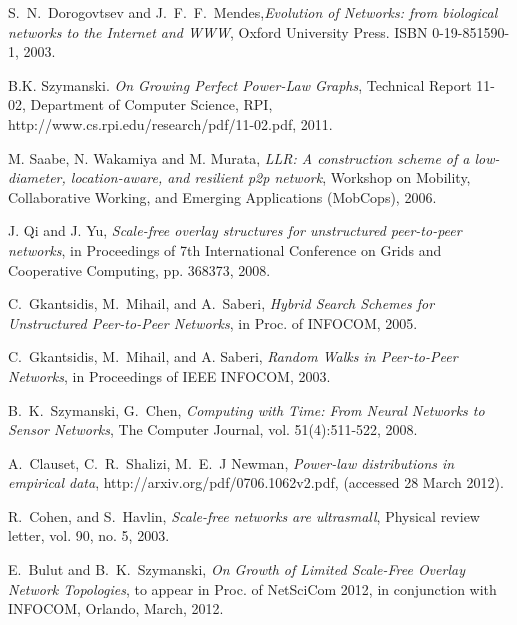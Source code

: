 \documentclass[10pt,journal,cspaper,compsoc]{IEEEtran}
\begin{document}
\begin{thebibliography}{1}
 S.~N.~Dorogovtsev and J.~F.~F.~Mendes,\emph{Evolution of Networks: from biological networks to the Internet and WWW}, Oxford University Press. ISBN 0-19-851590-1, 2003.





 B.K. Szymanski. \emph{On Growing Perfect Power-Law Graphs}, Technical Report 11-02, Department of Computer Science, RPI, http://www.cs.rpi.edu/research/pdf/11-02.pdf, 2011.




M. Saabe, N. Wakamiya and M. Murata, \emph{LLR: A construction scheme of a low-diameter, location-aware, and resilient p2p network}, Workshop on Mobility, Collaborative Working, and Emerging Applications (MobCops), 2006.



 J. Qi and J. Yu, \emph{Scale-free overlay structures for unstructured peer-to-peer networks}, in Proceedings of 7th International Conference on Grids and Cooperative Computing, pp. 368373, 2008.


 C.~Gkantsidis, M.~Mihail, and A.~Saberi, \emph{Hybrid Search Schemes for Unstructured Peer-to-Peer Networks}, in Proc. of INFOCOM, 2005.

 C.~Gkantsidis, M.~Mihail, and A. Saberi, \emph{Random Walks in Peer-to-Peer Networks}, in Proceedings of IEEE INFOCOM, 2003.



 B.~K.~Szymanski, G.~Chen, \emph{Computing with Time: From Neural Networks to Sensor Networks}, The Computer Journal, vol. 51(4):511-522, 2008.

 A.~Clauset, C.~R.~Shalizi, M.~E.~J Newman, \emph{Power-law distributions in empirical data}, http://arxiv.org/pdf/0706.1062v2.pdf, (accessed 28 March 2012).


 R.~Cohen, and S.~Havlin, \emph{Scale-free networks are ultrasmall}, Physical review letter, vol. 90, no. 5, 2003.

 E.~Bulut and B.~K.~Szymanski, \emph{On Growth of Limited Scale-Free Overlay Network Topologies}, to appear in Proc. of NetSciCom 2012, in conjunction with INFOCOM, Orlando, March, 2012.



\end{thebibliography}
\end{document}

